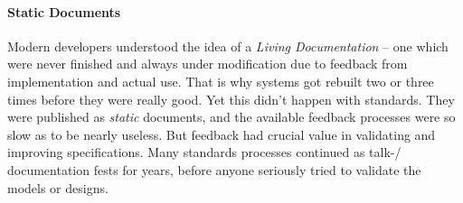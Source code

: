 %
%
%
%
%
%
%

\paragraph{Static Documents}
\label{static_documents_heading}

Modern developers understood the idea of a \emph{Living Documentation} -- one
which were never finished and always under modification due to feedback from
implementation and actual use. That is why systems got rebuilt two or three
times before they were really good. Yet this didn't happen with standards.
They were published as \emph{static} documents, and the available feedback
processes were so slow as to be nearly useless. But feedback had crucial value
in validating and improving specifications. Many standards processes continued
as talk-/ documentation fests for years, before anyone seriously tried to
validate the models or designs.
